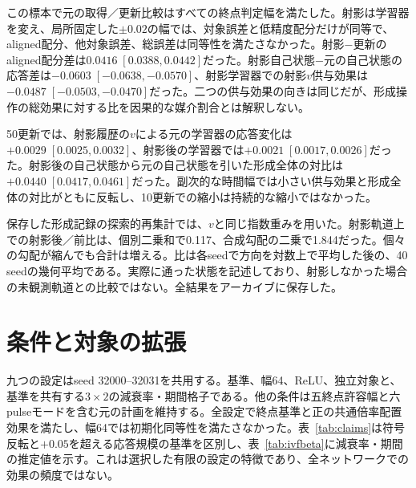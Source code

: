 この標本で元の取得／更新比較はすべての終点判定幅を満たした。射影は学習器を変え、局所固定した$\pm0.02$の幅では、対象誤差と低精度配分だけが同等で、aligned配分、他対象誤差、総誤差は同等性を満たさなかった。射影−更新のaligned配分差は$0.0416\;[0.0388,0.0442]$だった。射影自己状態−元の自己状態の応答差は$-0.0603\;[-0.0638,-0.0570]$、射影学習器での射影$v$供与効果は$-0.0487\;[-0.0503,-0.0470]$だった。二つの供与効果の向きは同じだが、形成操作の総効果に対する比を因果的な媒介割合とは解釈しない。

50更新では、射影履歴の$v$による元の学習器の応答変化は$+0.0029\;[0.0025,0.0032]$、射影後の学習器では$+0.0021\;[0.0017,0.0026]$だった。射影後の自己状態から元の自己状態を引いた形成全体の対比は$+0.0440\;[0.0417,0.0461]$だった。副次的な時間幅では小さい供与効果と形成全体の対比がともに反転し、10更新での縮小は持続的な縮小ではなかった。

保存した形成記録の探索的再集計では、$v$と同じ指数重みを用いた。射影軌道上での射影後／前比は、個別二乗和で0.117、合成勾配の二乗で1.844だった。個々の勾配が縮んでも合計は増える。比は各seedで方向を対数上で平均した後の、40 seedの幾何平均である。実際に通った状態を記述しており、射影しなかった場合の未観測軌道との比較ではない。全結果をアーカイブに保存した。


\section{条件と対象の拡張}
\label{app:extension}
九つの設定はseed 32000--32031を共用する。基準、幅64、ReLU、独立対象と、基準を共有する$3\times2$の減衰率・期間格子である。他の条件は五終点許容幅と六pulseモードを含む元の計画を維持する。全設定で終点基準と正の共通倍率配置効果を満たし、幅64では初期化同等性を満たさなかった。表~\ref{tab:claims}は符号反転と$+0.05$を超える応答規模の基準を区別し、表~\ref{tab:ivfbeta}に減衰率・期間の推定値を示す。これは選択した有限の設定の特徴であり、全ネットワークでの効果の頻度ではない。

